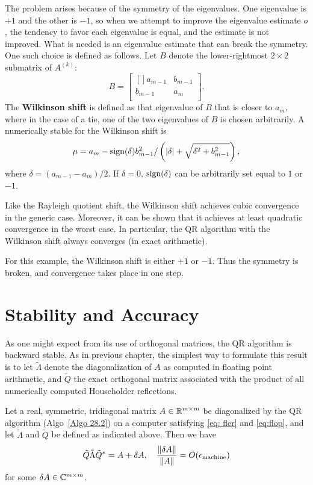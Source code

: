 The problem arises because of the symmetry of the eigenvalues. One eigenvalue is $+1$ and the other is $-1$, so when we attempt to improve the eigenvalue estimate $o$, the tendency to favor each eigenvalue is equal, and the estimate is not improved. What is needed is an eigenvalue estimate that can break the symmetry. One such choice is defined as follows. Let $ B $ denote the lower-rightmost $ 2 \times 2$ submatrix of $ A^{(k)} $: 
\[
    B = \begin{bmatrix}[] 
        a_{m-1} &  b_{m-1} \\
        b_{m-1} &  a_{m} \\
    \end{bmatrix}.  
\]
The \textbf{Wilkinson shift} is defined as that eigenvalue of $ B $ that is closer to $ a_m $, where in the case of a tie, one of the two eigenvalues of $ B $ is chosen arbitrarily. A numerically stable for the Wilkinson shift is 
\begin{equation}
\label{eq: wilkinson shift}
    \mu = a_m - \mathop{\mathrm{sign}}(\delta ) b_{m-1}^{2} / \left( |\delta | + \sqrt{\delta ^{2} + b_{m-1}^{2} }  \right) , 
\end{equation}
where $ \delta = (a_{m-1}-a_m) /2 $. If $\delta =0$, $ \mathop{\mathrm{sign}} (\delta ) $ can be arbitrarily set equal to $ 1 $ or $ -1 $. 

Like the Rayleigh quotient shift, the Wilkinson shift achieves cubic convergence in the generic case. Moreover, it can be shown that it achieves at least quadratic convergence in the worst case. In particular, the QR algorithm with the Wilkinson shift always converges (in exact arithmetic). 

For this example, the Wilkinson shift is either $ +1 $ or $ -1 $. Thus the symmetry is broken, and convergence takes place in one step.  

\section{Stability and Accuracy} 
As one might expect from its use of orthogonal matrices, the QR algorithm is backward stable. As in previous chapter, the simplest way to formulate this result is to let $ \tilde \Lambda  $ denote the diagonalization of $ A $ as computed in floating point arithmetic, and $ \tilde Q $ the exact orthogonal matrix associated with the product of all numerically computed Householder reflections. 


\begin{theorem}
\label{thm: Backstab of QR for eig}
Let a real, symmetric, tridiagonal matrix $ A\in \mathbb{R}^{m \times  m} $ be diagonalized by the QR algorithm (Algo~\ref{Algo 28.2}) on a computer satisfying \eqref{eq: fler} and \eqref{eq:flop}, and let $ \tilde \Lambda  $ and $ \tilde Q  $ be defined as indicated above. Then we have 
\begin{equation}
\label{eq: Backstab of QR for eig}
    \tilde Q \tilde \Lambda  \tilde Q ^{*} = A + \delta A, \quad \frac{\|\delta A\|}{\|A\|} = O(\epsilon_{\text{machine}})
\end{equation}
for some $ \delta A \in \mathbb{C}^{m \times  m} $. 
\end{theorem}

